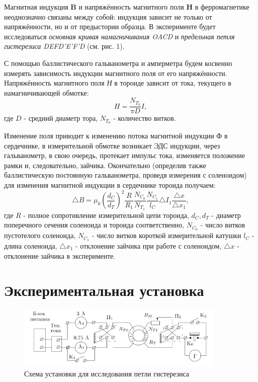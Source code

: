 \documentclass[a4paper]{article}
\begin{document}
Магнитная индукция \textbf{B} и напряжённость магнитного поля \textbf{H} в ферромагнетике неоднозначно связаны между собой: индукция зависит не только от напряжённости, но и от предыстории образца. В эксперименте будет исследоваться \textit{основная кривая намагничивания OACD} и \textit{предельная петля гистерезиса DEFD'E'F'D} (см. рис. 1).

С помощью баллистического гальванометра и амперметра будем косвенно измерять зависимость индукции магнитного поля от его напряжённости. \\
Напряжённость магнитного поля \textit{Н} в тороиде зависит от тока, текущего в намагничивающей обмотке:
\begin{equation}
    H = \frac{N_{T_0}}{\pi D}I,
\end{equation} 
где $D$ - средний диаметр тора, $N_{T_0}$ - количество витков.

Изменение поля приводит к изменению потока магнитной индукции Ф в сердечнике, в измерительной обмотке возникает ЭДС индукции, через гальванометр, в свою очередь, протекает импульс тока, изменяется положение рамки и, следовательно, зайчика. Окончательно (определив также баллистическую постоянную гальванометра, проведя измерения с соленоидом) для изменения магнитной индукции в сердечнике тороида получаем:
\begin{equation}
    \triangle B = \mu_0 (\frac{d_C}{d_T})^2 \frac{R}{R_1} \frac{N_C_0}{N_T_1} \frac{N_C_1}{l_C} \triangle I_1 \frac{\triangle x}{\triangle x_1},
\end{equation}
где $R$ - полное сопротивление измерительной цепи тороида, $d_C, d_T$ - диаметр поперечного сечения соленоида и тороида соответственно, $N_C_0$  - число витков пустотелого соленоида, $N_C_1$ - число витков короткой измерительной катушки $l_C$ - длина соленоида, $\triangle x_1$ - отклонение зайчика при работе с соленоидом, $\triangle x$ - отклонение зайчика в эксперименте.

\section{Экспериментальная установка}

\begin{figure}[h]
    \centering
    \includegraphics[width=10cm]{fig2.PNG}
    \caption{Схема установки для исследования петли гистерезиса}
    \label{fig:vac}
\end{figure}
\end{document}
